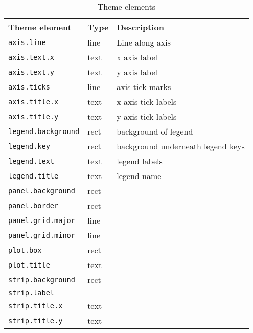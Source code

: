 \begin{table}
  \begin{center}
  \begin{tabular}{lll}\\
    \toprule
    Theme element              & Type   & Description  \\
    \midrule                             
    \texttt{axis.line}         & line   & Line along axis  \\
    \texttt{axis.text.x}       & text   & x axis label  \\
    \texttt{axis.text.y}       & text   & y axis label  \\
    \texttt{axis.ticks}        & line   & axis tick marks  \\
    \texttt{axis.title.x}      & text   & x axis tick labels  \\
    \texttt{axis.title.y}      & text   & y axis tick labels  \\[0.5em]
    \texttt{legend.background} & rect   & background of legend  \\
    \texttt{legend.key}        & rect   & background underneath legend keys \\
    \texttt{legend.text}       & text   & legend labels  \\
    \texttt{legend.title}      & text   & legend name  \\[0.5em]
    \texttt{panel.background}  & rect   &   \\
    \texttt{panel.border}      & rect   &   \\
    \texttt{panel.grid.major}  & line   &   \\
    \texttt{panel.grid.minor}  & line   &   \\[0.5em]
    \texttt{plot.box}          & rect   &   \\
    \texttt{plot.title}        & text   &   \\[0.5em]
    \texttt{strip.background}  & rect   &   \\
    \texttt{strip.label}       &        &   \\
    \texttt{strip.title.x}     & text   &   \\
    \texttt{strip.title.y}     & text   &   \\
    \bottomrule
  
  \end{tabular}
  \end{center}
  \caption{Theme elements}
  \label{tbl:elements}
\end{table}

